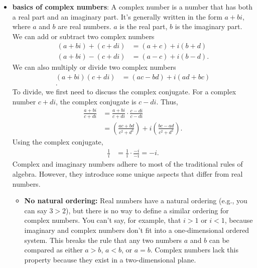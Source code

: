 \documentclass{report}
\begin{document}
\begin{itemize}
        \item \textbf{basics of complex numbers}: A complex number is a number that has both a real part and an imaginary part. It’s generally written in the form $a+bi$, where $a$ and $b$ are real numbers. $a$ is the real part, $b$ is the imaginary part.
            \bigbreak \noindent 
            We can add or subtract two complex numbers
            \begin{align*}
                (a + bi) + (c + di) &= (a+c) + i (b + d)\\
                (a+bi) - (c+di) &= (a-c) + i(b-d)
            .\end{align*}
            \bigbreak \noindent 
            We can also multiply or divide two complex numbers
            \begin{align*}
                (a + bi)(c+di) &= (ac-bd) + i(ad+bc) \\
            .\end{align*}
            To divide, we first need to discuss the complex conjugate. For a complex number $c+di$, the complex conjugate is $c-di$. Thus,
            \begin{align*}
                \frac{a+bi}{c+di} &= \frac{a+bi}{c+di} \cdot \frac{c-di}{c-di} \\
                                  &= \left(\frac{ac+bd}{c^{2} + d^{2}}\right) + i \left(\frac{bc-ad}{c^{2}+d^{2}}\right)
            .\end{align*}
            \bigbreak \noindent 
            Using the complex conjugate, 
            \begin{align*}
                \frac{1}{i} &= \frac{1}{i}\cdot \frac{-i}{-i} = -i
            .\end{align*}
            \bigbreak \noindent 
            Complex and imaginary numbers adhere to most of the traditional rules of algebra. However, they introduce some unique aspects that differ from real numbers.
           \begin{itemize}
               \item \textbf{No natural ordering:} Real numbers have a natural ordering (e.g., you can say \(3 > 2\)), but there is no way to define a similar ordering for complex numbers. You can’t say, for example, that \(i > 1\) or \(i < 1\), because imaginary and complex numbers don’t fit into a one-dimensional ordered system.
                   \bigbreak \noindent 
                This breaks the rule that any two numbers \(a\) and \(b\) can be compared as either \(a > b\), \(a < b\), or \(a = b\). Complex numbers lack this property because they exist in a two-dimensional plane.
           \end{itemize} 

    \end{itemize}
\end{document}
